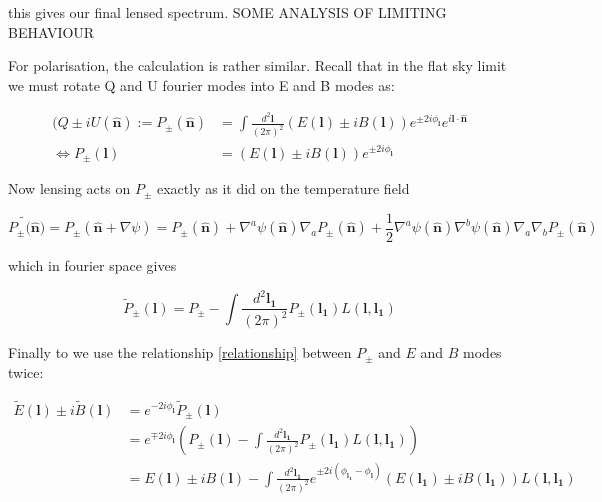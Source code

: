 \documentclass[a4paper,10pt]{article}
\renewcommand{\v}[1]{\mathbf{#1}}
\newcommand{\half}{\frac{1}{2}}
\newcommand{\finttwo}[1]{\int \frac{d^2 \v{#1}}{(2\pi)^2}}
\newcommand{\unit}[1]{\hat{\v{#1}}}
\begin{document}
this gives our final lensed spectrum. SOME ANALYSIS OF LIMITING BEHAVIOUR

For polarisation, the calculation is rather similar. Recall that in the flat sky limit we must rotate Q and U fourier modes into E and B modes as:

\begin{equation}\begin{split}
(Q\pm iU(\unit{n}) := P_{\pm} (\unit{n}) &= \finttwo{l}(E(\v{l})\pm i B(\v{l}))e^{\pm 2i\phi_{\v{l}}}e^{i\v{l}\cdot\unit{n}}\\
\Leftrightarrow  P_{\pm}(\v{l}) &= (E(\v{l})\pm i B(\v{l}))e^{\pm 2i\phi_{\v{l}}}
\label{relationship}
\end{split}\end{equation}

Now lensing acts on $P_{\pm}$ exactly as it did on the temperature field 

\begin{equation}
\tilde{P_{\pm}(\unit{n}}) = P_{\pm}(\unit{n}+\nabla\psi) =P_{\pm}(\unit{n})+\nabla^a\psi(\unit{n})\nabla_aP_{\pm}(\unit{n})+\half\nabla^a\psi(\unit{n})\nabla^b\psi(\unit{n})\nabla_a\nabla_bP_{\pm}(\unit{n})
\end{equation}

which in fourier space gives

\begin{equation}
\tilde{P}_{\pm}(\v{l}) = P_{\pm} - \finttwo{l_1} P_{\pm}(\v{l_1})L(\v{l},\v{l_1})
\end{equation}

Finally to we use the relationship \ref{relationship} between $P_\pm$ and $E$ and $B$ modes twice:

\begin{equation}\begin{split}
\tilde{E}(\v{l})\pm i\tilde{B}(\v{l}) &= e^{-2i\phi_\v{l}}\tilde{P}_{\pm}(\v{l})\\
&=e^{\mp 2i\phi_\v{l}}(P_{\pm}(\v{l}) - \finttwo{l_1} P_{\pm}(\v{l_1})L(\v{l},\v{l_1}))\\
&=E(\v{l})\pm iB(\v{l})-\finttwo{l_1} e^{\pm 2i(\phi_\v{l_1}-\phi_\v{l})}(E(\v{l_1})\pm iB(\v{l_1}))L(\v{l},\v{l_1})
\label{lensedEBmodes}
\end{split}\end{equation}

\end{document}
